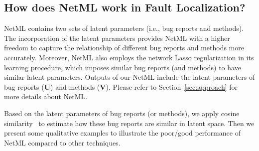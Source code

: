 \subsection{How does NetML work in Fault Localization?}
NetML contains two sets of latent parameters (i.e., bug reports and methods). The incorporation of the latent parameters provides NetML with a higher freedom to capture the relationship of different bug reports and methods more accurately. Moreover, NetML also employs the network Lasso regularization in its learning procedure, which imposes similar bug reports (and methods) to have similar latent parameters. Outputs of our NetML include the latent parameters of bug reports ($\mathbf{U}$) and methods ($\mathbf{V}$). Please refer to Section~\ref{sec:approach} for more details about NetML. 

Based on the latent parameters of bug reports (or methods), we apply cosine similarity~\cite{Salton:1975:VSM:361219.361220} to estimate how these bug reports are similar in latent space. Then we present some qualitative examples to illustrate the poor/good performance of NetML compared to other techniques. %

